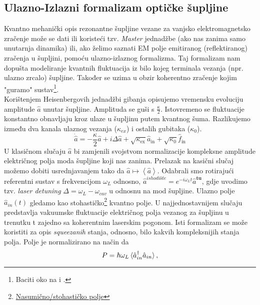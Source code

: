 \subsection{Ulazno-Izlazni formalizam optičke šupljine}
Kvantno mehanički opis rezonantne šupljine vezane za vanjsko elektromagnetsko zračenje može se dati ili koristeći tzv. \textit{Master} jednadžbe (ako nas
zanima samo unutarnja dinamika) ili, ako želimo saznati EM polje emitiranog (reflektiranog) zračenja u šupljini, pomoću ulazno-izlaznog formalizma. 
Taj formalizam nam dopušta modeliranje kvantnih fluktuacija iz bilo kojeg terminala vezanja (npr. ulazno zrcalo) šupljine. Također se uzima u obzir koherentno
zračenje kojim "guramo" sustav\footnote{Baciti oko na \cite{gardiner_zoller_2004} i \cite{clerk_devoret_girvin_marquardt_schoelkopf_2010}.}.\\
Korištenjem Heisenbergovih jednadžbi gibanja opisujemo vremensku evoluciju amplitude $\hat{a}$ unutar šupljine. Amplituda se guši s $\frac{\kappa}{2}$. Istovremeno
se fluktuacije konstantno obnavljaju kroz ulaze u šupljinu putem kvantnog šuma. Razlikujemo između dva kanala ulaznog vezanja ($\kappa_{ex}$) i ostalih gubitaka ($\kappa_0$).
\begin{equation}
\dot{\hat{a}}=-\frac{\kappa}{2} \hat{a}+i \Delta \hat{a}+\sqrt{\kappa_{\mathrm{ex}}} \hat{a}_{\mathrm{in}}+\sqrt{\kappa_0} \hat{f}_{\mathrm{in}}
\label{eq:1}
\end{equation}
U klasičnom slučaju $\hat{a}$ bi zamjenili svojstvom normalizacije kompleksne amplitude električnog polja moda šupljine koji nas zanima. 
Prelazak na kasični slučaj možemo dobiti usrednjavanjem tako da $\hat{a} \mapsto \left<\hat{a}\right>$. Odabrali smo rotirajući referentni sustav s frekvencijom $\omega_L$ odnosno,
$\hat{a}^{ishodište} = e^{-i\omega_L t}\hat{a}^{\textbf{tu}}$, gdje uvodimo tzv. \textit{laser detuning} $\Delta = \omega_L - \omega_{cav}$ u odnosnu na mod šupljine. 
Ulazno polje $\hat{a}_{in}(t)$ gledamo kao stohastičko\footnote{\href{https://en.wikipedia.org/wiki/Random_field}{Nasumično/stohastičko polje}} kvantno polje. U najjednostavnijem slučaju predstavlja vakuumske fluktuacije 
električnog polja vezanog za šupljinu u trenutku t zajedno sa koherentnim laserskim pogonom. Isti formalizam se može koristiti za opis \textit{squeezanih} stanja, odnosno, bilo kakvih kompleksnijih stanja polja. 
Polje je normalizirano na način da 
\begin{equation}
	P = \hbar \omega_L \braket{\hat{a}_{in}^{\dagger}\hat{a}_{in}},
	\label{eq:2}
\end{equation}
